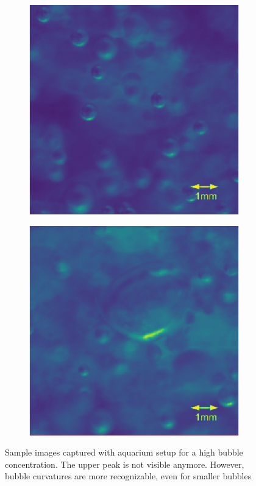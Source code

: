 					
		\begin{figure}[h]
			\begin{subfigure}[t]{.4\textwidth}
				\centering
				\includegraphics[scale=0.45]{images/aquarium_result_high_conc_1.png}
				\caption{}
			\end{subfigure}\hfill
			\begin{subfigure}[t]{.4\textwidth}
				\centering
				\includegraphics[scale=0.45]{images/aquarium_result_high_conc_2.png}
				\caption{}
				\label{subfig:too_large_bubble}
			\end{subfigure}\hfill		
			\caption{Sample images captured with aquarium setup for a high bubble concentration. The upper peak is not visible anymore. However, bubble curvatures are more recognizable, even for smaller bubbles}
			\label{fig:aquarium_result_high_conc}
		\end{figure}							
					
